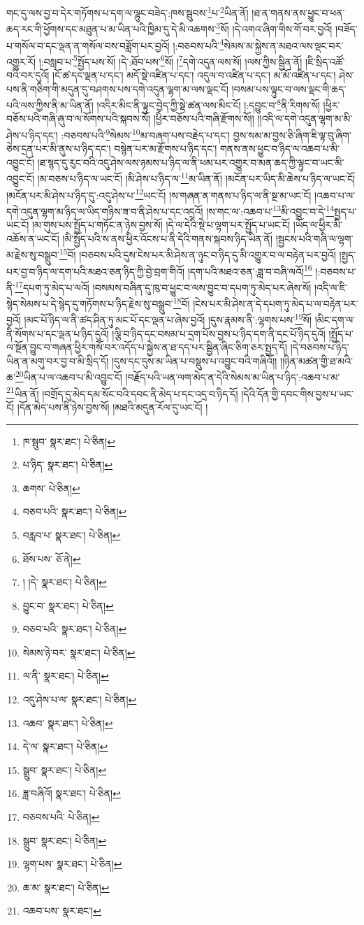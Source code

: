 གང་དུ་ལས་བྱ་བ་དེར་གཏོགས་པ་དག་ལ་ལྷུང་བཟེད་:ཁས་སྦུབས་\footnote{ཁ་སྦུབ་  སྣར་ཐང་།  པེ་ཅིན། }པ་\footnote{པ་ཉིད་  སྣར་ཐང་།  པེ་ཅིན། }ཡིན་ནོ། །ཐ་ན་གནས་ནས་ཕྱུང་བ་ཕན་ཆད་རང་གི་ཕྱོགས་དང་མཐུན་པ་མ་ཡིན་པའི་ཁྱིམ་དུ་དེ་མི་འཆགས་\footnote{ཆགས་  པེ་ཅིན། }སོ། །དེ་འགའ་ཞིག་གིས་གོ་བར་བྱའོ། །བཟོད་པ་གསོལ་བ་དང་ལྡན་ན་གསོལ་བས་བཟློག་པར་བྱའོ། །:བཅབས་པའི་\footnote{བཅབ་པའི་  སྣར་ཐང་།  པེ་ཅིན། }སེམས་མ་སྐྱེས་ན་མཐའ་ལས་ལྡང་བར་འགྱུར་རོ། །:བསླབ་པ་\footnote{བརླབ་པ་  སྣར་ཐང་།  པེ་ཅིན། }སྤྱོད་པས་སོ། །དེ་:ཐོབ་པས་\footnote{ཐོས་པས་  ཅོ་ནེ། }སོ། །\footnote{། །དེ་  སྣར་ཐང་།  པེ་ཅིན། }དགེ་འདུན་ལས་སོ། །ལས་ཀྱིས་སྦྱིན་ནོ། །ཇི་སྲིད་འཚོ་བའི་བར་དུའོ། །ངོ་ཚ་དང་ལྡན་པ་དང་། མདོ་སྡེ་འཛིན་པ་དང་། འདུལ་བ་འཛིན་པ་དང་། མ་མོ་འཛིན་པ་དང་། ཤེས་པས་ནི་གཅིག་གི་མདུན་དུ་བཤགས་པས་དགེ་འདུན་ལྷག་མ་ལས་ལྡང་ངོ། །བསམ་པས་ལྟུང་བ་ལས་ལྡང་གི་ཆད་པའི་ལས་ཀྱིས་ནི་མ་ཡིན་ནོ། །འདིར་མིང་ནི་ལྟུང་བྱེད་ཀྱི་སྡེ་ཚན་ལས་མིང་ངོ། །:དབྱུང་བ་\footnote{བྱུང་བ་  སྣར་ཐང་།  པེ་ཅིན། }ནི་རིགས་སོ། །ཕྱིར་བཅོས་པའི་གཞི་ཞུ་བ་ལ་སོགས་པའི་སྐབས་སོ། །ཕྱིར་བཅོས་པའི་གཞི་རྫོགས་སོ།། །།འདི་ལ་དགེ་འདུན་ལྷག་མ་མི་ཤེས་པ་ཉིད་དང་། :བཅབས་པའི་\footnote{བཅབ་པའི་  སྣར་ཐང་།  པེ་ཅིན། }སེམས་\footnote{སེམས་ཉེ་བར་  སྣར་ཐང་།  པེ་ཅིན། }མ་བཞག་པས་བརྗེད་པ་དང་། བྱས་སམ་མ་བྱས་ཅི་ཞིག་ཇི་ལྟ་བུ་ཞིག་ཅེས་དྲན་པར་མི་ནུས་པ་ཉིད་དང་། བསྙེན་པར་མ་རྫོགས་པ་ཉིད་དང་། གནས་ནས་ཕྱུང་བ་ཉིད་ལ་འཆབ་པ་མི་འབྱུང་ངོ། །ཐ་སྙད་དུ་རུང་བའི་འདུ་ཤེས་ལས་ཉམས་པ་ཉིད་ལ་ནི་ཕམ་པར་འགྱུར་བ་མན་ཆད་ཀྱི་ལྟུང་བ་ཡང་མི་འབྱུང་ངོ། །མ་བཅས་པ་ཉིད་ལ་ཡང་ངོ། །མི་ཤེས་པ་ཉིད་ལ་\footnote{ལ་ནི་  སྣར་ཐང་།  པེ་ཅིན། }མ་ཡིན་ནོ། །མངོན་པར་ཡིད་མི་ཆེས་པ་ཉིད་ལ་ཡང་ངོ། །མངོན་པར་མི་ཤེས་པ་ཉིད་དུ་:འདུ་ཤེས་པ་\footnote{འདུ་ཤེས་པ་ལ་  སྣར་ཐང་།  པེ་ཅིན། }ཡང་ངོ། །ས་གཞན་ན་གནས་པ་ཉིད་ལ་ནི་སྔ་མ་ཡང་ངོ། །འཆབ་པ་ལ་དགེ་འདུན་ལྷག་མ་ཉིད་ལ་ཡིད་གཉིས་ཟ་བ་ནི་ཤེས་པ་དང་འདྲའོ། །ས་གང་ལ་:འཆབ་པ་\footnote{འཆབ་  སྣར་ཐང་།  པེ་ཅིན། }མི་འབྱུང་བ་དེ་\footnote{དེ་ལ་  སྣར་ཐང་།  པེ་ཅིན། }སྤྱད་པ་ཡང་ངོ། །མ་གུས་པས་སྤྱོད་པ་གཏོང་ན་ཉེས་བྱས་སོ། །དེ་ལ་དེའི་སྡེ་པ་ལྷག་པར་སྤྱོད་པ་ཡང་ངོ། །ཡོད་ལ་ཕྱིར་མི་འཆོས་ན་ཡང་ངོ། །མི་སྤྱོད་པའི་ས་ནས་ཕྱིར་འོངས་པ་ནི་དེའི་གནས་སྐབས་ཉིད་ཡིན་ནོ། །སྦྱངས་པའི་གཞི་ལ་ལྷག་མ་རྗེས་སུ་བསྒྲུབ་\footnote{སྒྲུབ་  སྣར་ཐང་།  པེ་ཅིན། }བོ། །བཅབས་པའི་དུས་ངེས་པར་མི་ཤེས་ན་ཉུང་བ་ཉིད་དུ་མི་འགྱུར་བ་ལ་བརྟེན་པར་བྱའོ། །སྤྱད་པར་བྱ་བ་ཉིད་ལ་དག་པའི་མཐའ་ཅན་ཉིད་ཀྱི་བྱེ་བྲག་གིའོ། །དག་པའི་མཐའ་ཅན་:ཟླ་བ་བཞི་ལའོ།\footnote{ཟླ་བཞིའོ།  སྣར་ཐང་།  པེ་ཅིན། } །:བཅབས་པ་ནི་\footnote{བཅབས་པའི་  པེ་ཅིན། }དཔག་ཏུ་མེད་པ་ལའོ། །བསམས་བཞིན་དུ་ཁུ་བ་ཕྱུང་བ་ལས་བྱུང་བ་དཔག་ཏུ་མེད་པར་ཞེས་སོ། །འདི་ལ་ཇི་སྙེད་སེམས་པ་དེ་སྙེད་དུ་གཏོགས་པ་ཉིད་རྗེས་སུ་བསྒྲུབ་\footnote{སྒྲུབ་  སྣར་ཐང་།  པེ་ཅིན། }བོ། །ངེས་པར་མི་ཤེས་ན་དེ་དཔག་ཏུ་མེད་པ་ལ་བརྟེན་པར་བྱའོ། །མང་པོ་ཉིད་ལ་ནི་ཚད་ཤིན་ཏུ་མང་པོ་དང་ལྡན་པ་ཞེས་བྱའོ། །དུས་རྣམས་ནི་:ལྷགས་པས་\footnote{ལྷག་པས་  སྣར་ཐང་།  པེ་ཅིན། }སོ། །མིང་དག་ལ་ནི་སོགས་པ་དང་ལྡན་པ་ཉིད་དུའོ། །ལྕི་བ་ཉིད་དང་བསམ་པ་དྲག་པོས་བྱས་པ་ཉིད་དག་ནི་དང་པོ་ཉིད་དུའོ། །སྤྱོད་པ་ལ་སྔོན་བྱུང་བ་གཞན་ཕྱིར་གསོ་བར་འདོད་པ་སྐྱེས་ན་ཐ་དད་པར་སྦྱིན་ཞིང་ཅིག་ཅར་སྤྱད་དོ། །དེ་བཅབས་པ་ཉིད་ཡིན་ན་མགུ་བར་བྱ་བ་མི་སྲིད་དོ། །དུས་དང་དུས་མ་ཡིན་པ་བསྡུས་པ་འབྱུང་བའི་གཞིའོ།། །།ཉིན་མཚན་གྱི་ཐ་མའི་ཆ་\footnote{ཆ་མ་  སྣར་ཐང་།  པེ་ཅིན། }ཡིན་པ་ལ་འཆབ་པ་མི་འབྱུང་ངོ། །བརྗོད་པའི་ཡན་ལག་མེད་ན་དེའི་སེམས་མ་ཡིན་པ་ཉིད་:འཆབ་པ་མ་\footnote{འཆབ་པས་  སྣར་ཐང་། }ཡིན་ནོ། །བགྲོད་དུ་མེད་དམ་སོང་བའི་དབང་ནི་མེད་པ་དང་འདྲ་བ་ཉིད་དོ། །དེའི་དོན་གྱི་དབང་གིས་བྱས་པ་ཡང་ངོ། །དོན་མེད་པས་ནི་ཉེས་བྱས་སོ། །མཐའི་མདུན་རོལ་དུ་ཡང་ངོ། །
